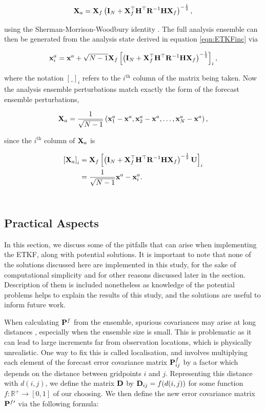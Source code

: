 \[
\mathbf{X}_a = \mathbf{X}_f \left( \mathbf{I}_N + \mathbf{X}_f^\top \mathbf{H}^\top \mathbf{R}^{-1} \mathbf{H} \mathbf{X}_f \right)^{-\frac 1 2},
\]

using the Sherman-Morrison-Woodbury identity \citep[p. 50]{Golub1996}. The full analysis ensemble can then be generated from the analysis state derived in equation \ref{eqn:ETKFinc} via

\begin{equation}
\mathbf{x}^a_i = \mathbf{x}^a + \sqrt{N-1} \mathbf{X}_f \left[ \left( \mathbf{I}_N + \mathbf{X}_f^\top \mathbf{H}^\top \mathbf{R}^{-1} \mathbf{H} \mathbf{X}_f \right)^{-\frac 1 2} \right]_i,
\label{eqn:ETKFens}
\end{equation}

where the notation $[\_]_i$ refers to the $i^\text{th}$ column of the matrix being taken. Now the analysis ensemble perturbations match exactly the form of the forecast ensemble perturbations,

\begin{equation}
\mathbf{X}_a = \frac{1}{\sqrt{N- 1}} \left( \mathbf{x}^a_1 - \mathbf{x}^a, \mathbf{x}^a_2 - \mathbf{x}^a, \dots, \mathbf{x}^a_N - \mathbf{x}^a \right),
\end{equation}

since the $i^\text{th}$ column of $\mathbf{X}_a$ is

\begin{align*}
\left[ \mathbf{X}_a \right]_i &= \mathbf{X}_f \left[ \left( \mathbf{I}_N + \mathbf{X}_f^\top \mathbf{H}^\top \mathbf{R}^{-1} \mathbf{H} \mathbf{X}_f \right)^{-\frac 1 2} \mathbf{U} \right]_i \\
&= \frac{1}{\sqrt{N-1}} \mathbf{x}^a - \mathbf{x}^a_i.
\end{align*}\

\subsection{Practical Aspects}
\label{sec:DApractice}

In this section, we discuss some of the pitfalls that can arise when implementing the ETKF, along with potential solutions. It is important to note that none of the solutions discussed here are implemented in this study, for the sake of computational simplicity and for other reasons discussed later in the section. Description of them is included nonetheless as knowledge of the potential problems helps to explain the results of this study, and the solutions are useful to inform future work.

When calculating $\mathbf{P}^f$ from the ensemble, spurious covariances may arise at long distances \citep{Hunt2007}, especially when the ensemble size is small. This is problematic as it can lead to large increments far from observation locations, which is physically unrealistic. One way to fix this is called localisation, and involves multiplying each element of the forecast error covariance matrix $\mathbf{P}^f_{ij}$ by a factor which depends on the distance between gridpoints $i$ and $j$. Representing this distance with $d(i,j)$, we define the matrix $\mathbf{D}$ by $\mathbf{D}_{ij} = f(d(i,j))$ for some function $f: \mathbb{R}^+ \rightarrow [0,1]$ of our choosing. We then define the new error covariance matrix $\mathbf{P}^{f\prime}$ via the following formula:

